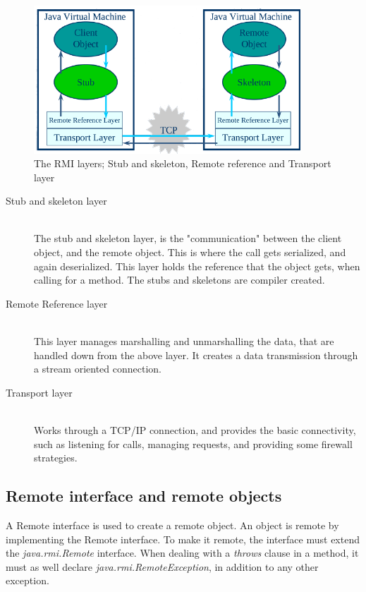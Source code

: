 \begin{figure}[ht!]
\centering
\includegraphics[width=100mm]{img/RMI_layer.png}
\caption{The RMI layers; Stub and skeleton, Remote reference and Transport layer}
\label{Remote Layers}
\end{figure}

\begin{description}
 \item[Stub and skeleton layer] \hfill \\
The stub and skeleton layer, is the "communication" between the client object, and the remote object. This is where the call gets serialized, and again deserialized. This layer holds the reference that the object gets, when calling for a method. The stubs and skeletons are compiler created.

 \item[Remote Reference layer] \hfill \\
This layer manages marshalling and unmarshalling the data, that are handled down from the above layer. It creates a data transmission through a stream oriented connection.

 \item[Transport layer] \hfill \\
Works through a TCP/IP connection, and provides the basic connectivity, such as listening for calls, managing requests, and providing some firewall strategies.
\end{description}

\subsection{Remote interface and remote objects}


A Remote interface is used to create a remote object. An object is remote by implementing the Remote interface. To make it remote, the interface must extend the \emph{java.rmi.Remote} interface. When dealing with a \emph{throws} clause in a method, it must as well declare \emph{java.rmi.RemoteException}, in addition to any other exception.\\

